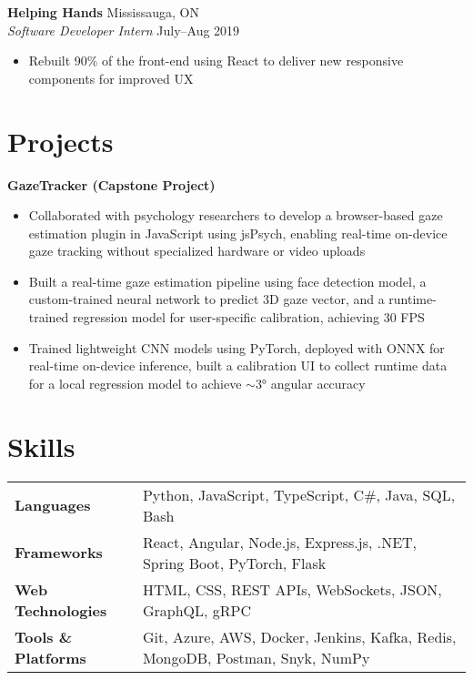 \documentclass[a4paper,10pt]{article}
\begin{document}
\textbf{Helping Hands} \hfill Mississauga, ON \\
\textit{Software Developer Intern} \hfill July–Aug 2019
\begin{itemize}
    \item Rebuilt 90\% of the front-end using React to deliver new responsive components for improved UX
\end{itemize}

\vspace{0.2em}

\section*{Projects}

\textbf{GazeTracker (Capstone Project)}
\begin{itemize}[itemsep=2pt]
    \item Collaborated with psychology researchers to develop a browser-based gaze estimation plugin in JavaScript using jsPsych, enabling real-time on-device gaze tracking without specialized hardware or video uploads
    \item Built a real-time gaze estimation pipeline using face detection model, a custom-trained neural network to predict 3D gaze vector, and a runtime-trained regression model for user-specific calibration, achieving 30 FPS
    \item Trained lightweight CNN models using PyTorch, deployed with ONNX for real-time on-device inference, built a calibration UI to collect runtime data for a local regression model to achieve $\sim$3° angular accuracy
\end{itemize}

\vspace{0.2em}

\section*{Skills}

\begin{tabular}{ l l }
\textbf{Languages} & Python, JavaScript, TypeScript, C\#, Java, SQL, Bash \\
\textbf{Frameworks} & React, Angular, Node.js, Express.js, .NET, Spring Boot, PyTorch, Flask \\
\textbf{Web Technologies} & HTML, CSS, REST APIs, WebSockets, JSON, GraphQL, gRPC \\
\textbf{Tools \& Platforms} & Git, Azure, AWS, Docker, Jenkins, Kafka, Redis, MongoDB, Postman, Snyk, NumPy \\
\end{tabular}
\end{document}
